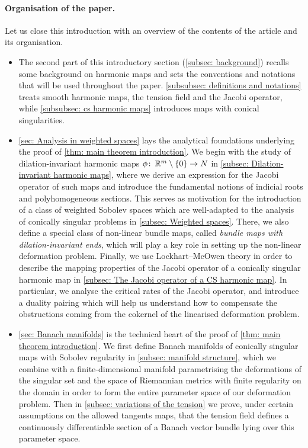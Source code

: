 \documentclass{article}
\numberwithin{equation}{section}        %
\theoremstyle{bfnote}
\theoremstyle{definition}
\theoremstyle{bfremark}
\newcommand{\col}{\colon \thinspace}        %
\newcommand{\R}{\mathbb{R}}                 %
\begin{document}
\paragraph{Organisation of the paper.} Let us close this introduction with an overview of the contents of the article and its organisation.
\begin{itemize}
    \item The second part of this introductory section (\cref{subsec: background}) recalls some background on harmonic maps and sets the conventions and notations that will be used throughout the paper. \cref{subsubsec: definitions and notations} treats smooth harmonic maps, the tension field and the Jacobi operator, while \cref{subsubsec: cs harmonic maps} introduces maps with conical singularities.
    
    \item \cref{sec: Analysis in weighted spaces} lays the analytical foundations underlying the proof of \cref{thm: main theorem introduction}. We begin with the study of dilation-invariant harmonic maps $\phi \col \R^m \setminus \{0\} \to N$ in \cref{subsec: Dilation-invariant harmonic maps}, where we derive an expression for the Jacobi operator of such maps and introduce the fundamental notions of indicial roots and polyhomogeneous sections. This serves as motivation for the introduction of a class of weighted Sobolev spaces which are well-adapted to the analysis of conically singular problems in \cref{subsec: Weighted spaces}. There, we also define a special class of non-linear bundle maps, called \emph{bundle maps with dilation-invariant ends}, which will play a key role in setting up the non-linear deformation problem. Finally, we use Lockhart--McOwen theory in order to describe the mapping properties of the Jacobi operator of a conically singular harmonic map in \cref{subsec: The Jacobi operator of a CS harmonic map}. In particular, we analyse the critical rates of the Jacobi operator, and introduce a duality pairing which will help us understand how to compensate the obstructions coming from the cokernel of the linearised deformation problem.

    \item \cref{sec: Banach manifolds} is the technical heart of the proof of \cref{thm: main theorem introduction}. We first define Banach manifolds of conically singular maps with Sobolev regularity in \cref{subsec: manifold structure}, which we combine with a finite-dimensional manifold parametrising the deformations of the singular set and the space of Riemannian metrics with finite regularity on the domain in order to form the entire parameter space of our deformation problem. Then in \cref{subsec: variations of the tension} we prove, under certain assumptions on the allowed tangents maps, that the tension field defines a continuously differentiable section of a Banach vector bundle lying over this parameter space.
    

\end{itemize}
\end{document}
